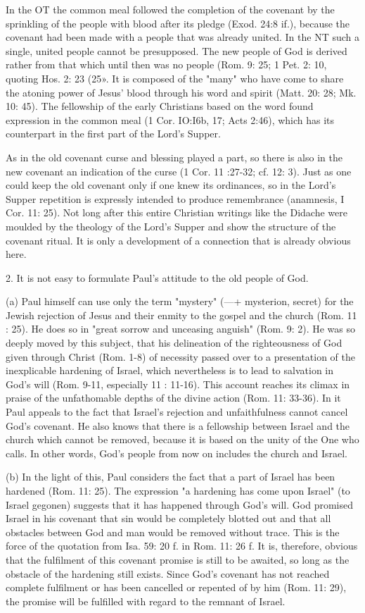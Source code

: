 				In the OT the common meal followed the completion of the covenant by the sprinkling of the people with blood after its pledge (Exod. 24:8 if.), because the covenant had been made with a people that was already united. In the NT such a single, united people cannot be presupposed. The new people of God is derived rather from that which until then was no people (Rom. 9: 25; 1 Pet. 2: 10, quoting Hos. 2: 23 (25». It is composed of the "many" who have come to share the atoning power of Jesus' blood through his word and spirit (Matt. 20: 28; Mk. 10: 45). The fellowship of the early Christians based on the word found expression in the common meal (1 Cor. IO:I6b, 17; Acts 2:46), which has its counterpart in the first part of the Lord's Supper. 

				As in the old covenant curse and blessing played a part, so there is also in the new covenant an indication of the curse (1 Cor. 11 :27-32; cf. 12: 3). Just as one could keep the old covenant only if one knew its ordinances, so in the Lord's Supper repetition is expressly intended to produce remembrance (anamnesis, I Cor. 11: 25). Not long after this entire Christian writings like the Didache were moulded by the theology of the Lord's Supper and show the structure of the covenant ritual. It is only a development of a connection that is already obvious here. 

				2. It is not easy to formulate Paul's attitude to the old people of God. 

				(a) Paul himself can use only the term "mystery" (---+ mysterion, secret) for the Jewish rejection of Jesus and their enmity to the gospel and the church (Rom. 11 : 25). He does so in "great sorrow and unceasing anguish" (Rom. 9: 2). He was so deeply moved by this subject, that his delineation of the righteousness of God given through Christ (Rom. 1-8) of necessity passed over to a presentation of the inexplicable hardening of Israel, which nevertheless is to lead to salvation in God's will (Rom. 9-11, especially 11 : 11-16). This account reaches its climax in praise of the unfathomable depths of the divine action (Rom. 11: 33-36). In it Paul appeals to the fact that Israel's rejection and unfaithfulness cannot cancel God's covenant. He also knows that there is a fellowship between Israel and the church which cannot be removed, because it is based on the unity of the One who calls. In other words, God's people from now on includes the church and Israel. 

				(b) In the light of this, Paul considers the fact that a part of Israel has been hardened (Rom. 11: 25). The expression "a hardening has come upon Israel" (to Israel gegonen) suggests that it has happened through God's will. God promised Israel in his covenant that sin would be completely blotted out and that all obstacles between God and man would be removed without trace. This is the force of the quotation from Isa. 59: 20 f. in Rom. 11: 26 f. It is, therefore, obvious that the fulfilment of this covenant promise is still to be awaited, so long as the obstacle of the hardening still exists. Since God's covenant has not reached complete fulfilment or has been cancelled or repented of by him (Rom. 11: 29), the promise will be fulfilled with regard to the remnant of Israel. 

